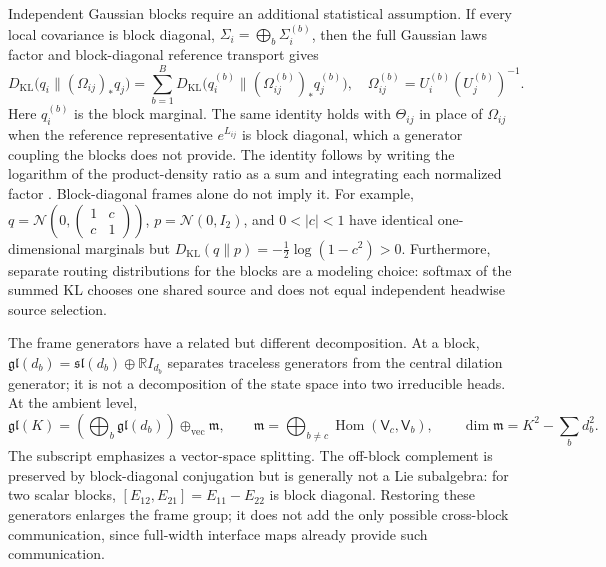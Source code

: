\documentclass[twoside,11pt]{article}
\begin{document}
Independent Gaussian blocks require an additional statistical assumption. If every local covariance is block diagonal, $\Sigma_i=\bigoplus_b\Sigma_i^{(b)}$, then the full Gaussian laws factor and block-diagonal reference transport gives
\begin{equation}
D_{\mathrm{KL}}\bigl(q_i\|(\Omega_{ij})_*q_j\bigr)
=\sum_{b=1}^{B}D_{\mathrm{KL}}\bigl(q_i^{(b)}\|(\Omega_{ij}^{(b)})_*q_j^{(b)}\bigr),
\quad \Omega_{ij}^{(b)}=U_i^{(b)}(U_j^{(b)})^{-1}.
\label{eq:irrep_block_kl_additivity}
\end{equation}
Here $q_i^{(b)}$ is the block marginal. The same identity holds with $\Theta_{ij}$ in place of $\Omega_{ij}$ when the reference representative $e^{L_{ij}}$ is block diagonal, which a generator coupling the blocks does not provide. The identity follows by writing the logarithm of the product-density ratio as a sum and integrating each normalized factor \citep[Thm.~28]{vanErvenHarremoes2014}. Block-diagonal frames alone do not imply it. For example, $q=\mathcal N(0,\left(\begin{smallmatrix}1&c\\c&1\end{smallmatrix}\right))$, $p=\mathcal N(0,I_2)$, and $0<|c|<1$ have identical one-dimensional marginals but $D_{\mathrm{KL}}(q\|p)=-\tfrac12\log(1-c^2)>0$. Furthermore, separate routing distributions for the blocks are a modeling choice: softmax of the summed KL chooses one shared source and does not equal independent headwise source selection.

The frame generators have a related but different decomposition. At a block, $\mathfrak{gl}(d_b)=\mathfrak{sl}(d_b)\oplus\mathbb RI_{d_b}$ separates traceless generators from the central dilation generator; it is not a decomposition of the state space into two irreducible heads. At the ambient level,
\begin{equation}
\mathfrak{gl}(K)=\left(\bigoplus_b\mathfrak{gl}(d_b)\right)
\oplus_{\mathrm{vec}}\mathfrak m,\qquad
\mathfrak m=\bigoplus_{b\ne c}\operatorname{Hom}(\mathsf V_c,\mathsf V_b),\qquad
\dim\mathfrak m=K^2-\sum_bd_b^2.
\label{eq:off_block_vector_complement}
\end{equation}
The subscript emphasizes a vector-space splitting. The off-block complement is preserved by block-diagonal conjugation but is generally not a Lie subalgebra: for two scalar blocks, $[E_{12},E_{21}]=E_{11}-E_{22}$ is block diagonal. Restoring these generators enlarges the frame group; it does not add the only possible cross-block communication, since full-width interface maps already provide such communication.
\end{document}
